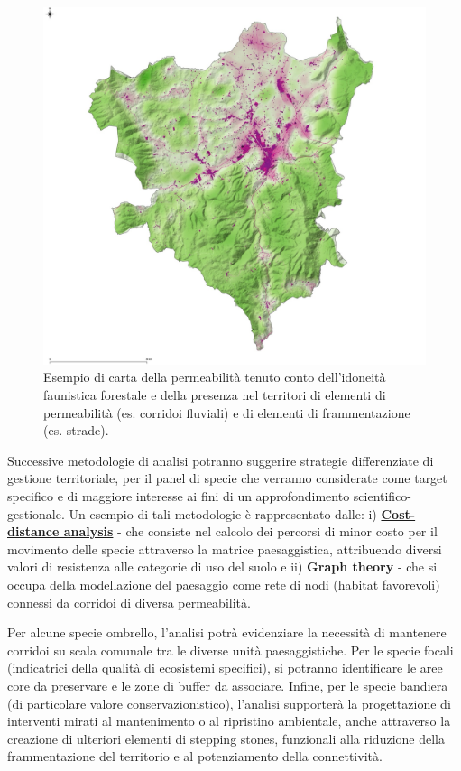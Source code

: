 \documentclass[
  a4paper,
]{book}
\begin{document}
\begin{figure}

{\centering \includegraphics[width=1\linewidth]{./figs/cartaBioperm} 

}

\caption{Esempio di carta della permeabilità tenuto conto dell'idoneità faunistica forestale e della presenza nel territori di elementi di permeabilità (es. corridoi fluviali) e di elementi di frammentazione (es. strade).}\label{fig:cbioperm}
\end{figure}

Successive metodologie di analisi potranno suggerire strategie differenziate di gestione territoriale, per il panel di specie che verranno considerate come target specifico e di maggiore interesse ai fini di un approfondimento scientifico-gestionale.
Un esempio di tali metodologie è rappresentato dalle: i) \href{https://spatialanalysisonline.com/HTML/cost_distance.htm}{\textbf{Cost-distance analysis}} \citep{keeley2016} - che consiste nel calcolo dei percorsi di minor costo per il movimento delle specie attraverso la matrice paesaggistica, attribuendo diversi valori di resistenza alle categorie di uso del suolo e ii) \textbf{Graph theory} \citep{wilson2010} - che si occupa della modellazione del paesaggio come rete di nodi (habitat favorevoli) connessi da corridoi di diversa permeabilità.

Per alcune specie ombrello, l'analisi potrà evidenziare la necessità di mantenere corridoi su scala comunale tra le diverse unità paesaggistiche.
Per le specie focali (indicatrici della qualità di ecosistemi specifici), si potranno identificare le aree core da preservare e le zone di buffer da associare.
Infine, per le specie bandiera (di particolare valore conservazionistico), l'analisi supporterà la progettazione di interventi mirati al mantenimento o al ripristino ambientale, anche attraverso la creazione di ulteriori elementi di stepping stones, funzionali alla riduzione della frammentazione del territorio e al potenziamento della connettività.
\end{document}
